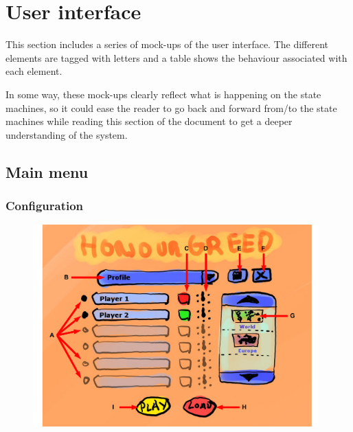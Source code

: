 \documentclass[12pt,a4paper]{article}
\let\stdsection\section
\renewcommand\section{\newpage\stdsection}
\begin{document}
\section{User interface}

This section includes a series of mock-ups of the user interface. The
different elements are tagged with letters and a table shows the
behaviour associated with each element.

In some way, these mock-ups clearly reflect what is happening on the
state machines, so it could ease the reader to go back and forward
from/to the state machines while reading this section of the document
to get a deeper understanding of the system.

\newpage
\subsection{Main menu}

\subsubsection{Configuration}

\begin{figure}[H]
  \centering
  \includegraphics[width=11cm]{pic/mocks/1-1.pdf}
\end{figure}
\end{document}
